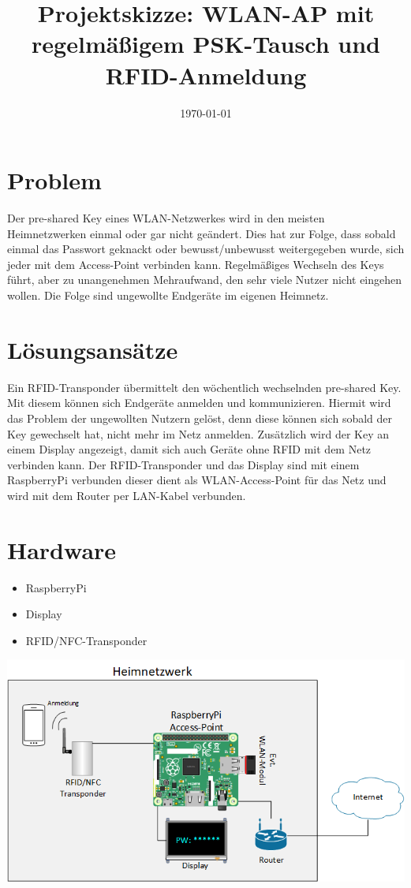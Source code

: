 \documentclass[a4paper]{article}
\title{Projektskizze: WLAN-AP mit regelmäßigem PSK-Tausch und RFID-Anmeldung}
\date{\today}
\begin{document}
	\maketitle
	
	
	\section{Problem}
	Der pre-shared Key eines WLAN-Netzwerkes wird in den meisten Heimnetzwerken einmal oder gar nicht geändert. Dies hat zur Folge, dass sobald einmal das Passwort geknackt oder bewusst/unbewusst weitergegeben wurde, sich jeder mit dem Access-Point verbinden kann. Regelmäßiges Wechseln des Keys führt, aber zu unangenehmen Mehraufwand, den sehr viele Nutzer nicht eingehen wollen. Die Folge sind ungewollte Endgeräte im eigenen Heimnetz.
	
	\section{Lösungsansätze}
	Ein RFID-Transponder übermittelt den wöchentlich wechselnden pre-shared Key. Mit diesem können sich Endgeräte anmelden und kommunizieren. Hiermit wird das Problem der ungewollten Nutzern gelöst, denn diese können sich sobald der Key gewechselt hat, nicht mehr im Netz anmelden. Zusätzlich wird der Key an einem Display angezeigt, damit sich auch Geräte ohne RFID mit dem Netz verbinden kann. Der RFID-Transponder und das Display sind mit einem RaspberryPi verbunden dieser dient als WLAN-Access-Point für das Netz und wird mit dem Router per LAN-Kabel verbunden.
	
	\section{Hardware}
	
	\begin{itemize}
		\item RaspberryPi
		\item Display
		\item RFID/NFC-Transponder
	\end{itemize}

	\includegraphics[scale=0.6]{skizze}
\end{document}
